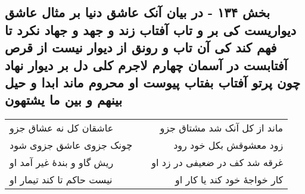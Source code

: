 \begin{center}
\section*{بخش ۱۳۴ - در بیان آنک عاشق دنیا بر مثال عاشق دیواریست کی بر و تاب آفتاب زند و جهد و جهاد نکرد تا فهم کند کی آن تاب و رونق از دیوار نیست از قرص آفتابست در آسمان چهارم لاجرم کلی دل بر دیوار نهاد چون پرتو آفتاب بفتاب پیوست او محروم ماند ابدا و حیل بینهم و بین ما یشتهون}
\label{sec:sh134}
\begin{longtable}{l p{0.5cm} r}
عاشقان کل نه عشاق جزو
&&
ماند از کل آنک شد مشتاق جزو
\\
چونک جزوی عاشق جزوی شود
&&
زود معشوقش بکل خود رود
\\
ریش گاو و بندهٔ غیر آمد او
&&
غرقه شد کف در ضعیفی در زد او
\\
نیست حاکم تا کند تیمار او
&&
کار خواجهٔ خود کند یا کار او
\\
\end{longtable}
\end{center}
